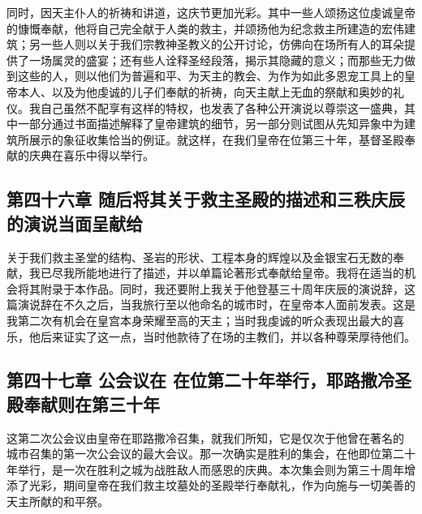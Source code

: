 同时，因天主仆人的祈祷和讲道，这庆节更加光彩。其中一些人颂扬这位虔诚皇帝的慷慨奉献，他将自己完全献于人类的救主，并颂扬他为纪念救主所建造的宏伟建筑；另一些人则以关于我们宗教神圣教义的公开讨论，仿佛向在场所有人的耳朵提供了一场属灵的盛宴；还有些人诠释圣经段落，揭示其隐藏的意义；而那些无力做到这些的人，则以他们为普遍和平、为天主的教会、为作为如此多恩宠工具上的皇帝本人、以及为他虔诚的儿子们奉献的祈祷，向天主献上无血的祭献和奥妙的礼仪。我自己虽然不配享有这样的特权，也发表了各种公开演说以尊崇这一盛典，其中一部分通过书面描述解释了皇帝建筑的细节，另一部分则试图从先知异象中为建筑所展示的象征收集恰当的例证。就这样，在我们皇帝在位第三十年，基督圣殿奉献的庆典在喜乐中得以举行。\par


\subsection{第四十六章  随后将其关于救主圣殿的描述和三秩庆辰的演说当面呈献给 }

关于我们救主圣堂的结构、圣岩的形状、工程本身的辉煌以及金银宝石无数的奉献，我已尽我所能地进行了描述，并以单篇论著形式奉献给皇帝。我将在适当的机会将其附录于本作品。同时，我还要附上我关于他登基三十周年庆辰的演说辞，这篇演说辞在不久之后，当我旅行至以他命名的城市时，在皇帝本人面前发表。这是我第二次有机会在皇宫本身荣耀至高的天主；当时我虔诚的听众表现出最大的喜乐，他后来证实了这一点，当时他款待了在场的主教们，并以各种尊荣厚待他们。\par


\subsection{第四十七章  公会议在  在位第二十年举行，耶路撒冷圣殿奉献则在第三十年}

这第二次公会议由皇帝在耶路撒冷召集，就我们所知，它是仅次于他曾在著名的  城市召集的第一次公会议的最大会议。那一次确实是胜利的集会，在他即位第二十年举行，是一次在胜利之城为战胜敌人而感恩的庆典。本次集会则为第三十周年增添了光彩，期间皇帝在我们救主坟墓处的圣殿举行奉献礼，作为向施与一切美善的天主所献的和平祭。\par



